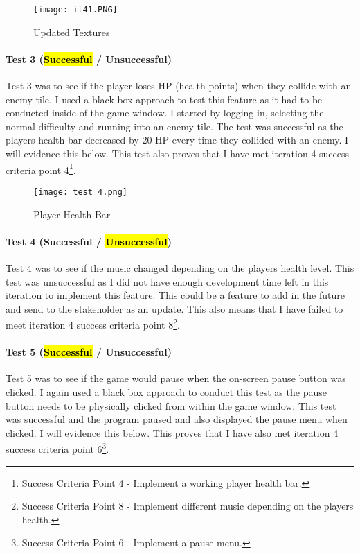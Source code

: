 \documentclass[12pt]{report}
\begin{document}
\begin{figure}[H]
    \centering
    \texttt{[image: it41.PNG]}
    \caption{Updated Textures}
\end{figure}

\paragraph{Test 3 (\hl{Successful} / Unsuccessful)}
Test 3 was to see if the player loses HP (health points) when they collide with an enemy tile. I used a black box approach to test this feature as it had to be conducted inside of the game window. I started by logging in, selecting the normal difficulty and running into an enemy tile. The test was successful as the players health bar decreased by 20 HP every time they collided with an enemy. I will evidence this below. This test also proves that I have met iteration 4 success criteria point 4\footnote{Success Criteria Point 4 - Implement a working player health bar.}.

\begin{figure}[H]
    \centering
    \texttt{[image: test 4.png]}
    \caption{Player Health Bar}
\end{figure}

\paragraph{Test 4 (Successful / \hl{Unsuccessful})}
Test 4 was to see if the music changed depending on the players health level. This test was unsuccessful as I did not have enough development time left in this iteration to implement this feature. This could be a feature to add in the future and send to the stakeholder as an update. This also means that I have failed to meet iteration 4 success criteria point 8\footnote{Success Criteria Point 8 - Implement different music depending on the players health.}.

\paragraph{Test 5 (\hl{Successful} / Unsuccessful)}
Test 5 was to see if the game would pause when the on-screen pause button was clicked. I again used a black box approach to conduct this test as the pause button needs to be physically clicked from within the game window. This test was successful and the program paused and also displayed the pause menu when clicked. I will evidence this below. This proves that I have also met iteration 4 success criteria point 6\footnote{Success Criteria Point 6 - Implement a pause menu.}. 
\end{document}
